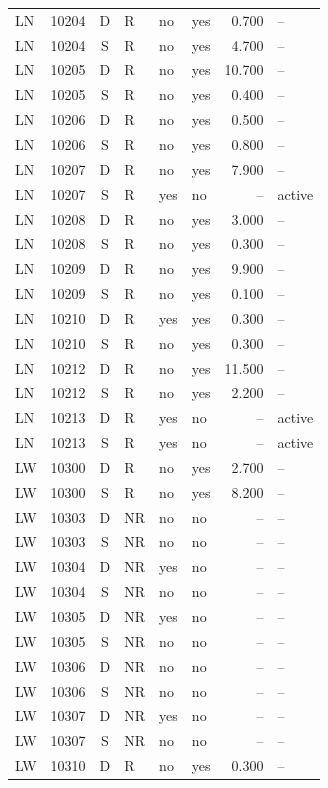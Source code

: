 \begin{longtable}{@{}llclllrl@{}}
LN & 10204 & D & R & no & yes & 0.700 & --\\
LN & 10204 & S & R & no & yes & 4.700 & --\\
LN & 10205 & D & R & no & yes & 10.700 & --\\
LN & 10205 & S & R & no & yes & 0.400 & --\\
LN & 10206 & D & R & no & yes & 0.500 & --\\
LN & 10206 & S & R & no & yes & 0.800 & --\\
LN & 10207 & D & R & no & yes & 7.900 & --\\
LN & 10207 & S & R & yes & no & -- & active\\
LN & 10208 & D & R & no & yes & 3.000 & --\\
LN & 10208 & S & R & no & yes & 0.300 & --\\
LN & 10209 & D & R & no & yes & 9.900 & --\\
LN & 10209 & S & R & no & yes & 0.100 & --\\
LN & 10210 & D & R & yes & yes & 0.300 & --\\
LN & 10210 & S & R & no & yes & 0.300 & --\\
LN & 10212 & D & R & no & yes & 11.500 & --\\
LN & 10212 & S & R & no & yes & 2.200 & --\\
LN & 10213 & D & R & yes & no & -- & active\\
LN & 10213 & S & R & yes & no & -- & active\\
LW & 10300 & D & R & no & yes & 2.700 & --\\
LW & 10300 & S & R & no & yes & 8.200 & --\\
LW & 10303 & D & NR & no & no & -- & --\\
LW & 10303 & S & NR & no & no & -- & --\\
LW & 10304 & D & NR & yes & no & -- & --\\
LW & 10304 & S & NR & no & no & -- & --\\
LW & 10305 & D & NR & yes & no & -- & --\\
LW & 10305 & S & NR & no & no & -- & --\\
LW & 10306 & D & NR & no & no & -- & --\\
LW & 10306 & S & NR & no & no & -- & --\\
LW & 10307 & D & NR & yes & no & -- & --\\
LW & 10307 & S & NR & no & no & -- & --\\
LW & 10310 & D & R & no & yes & 0.300 & --\\

\end{longtable}
